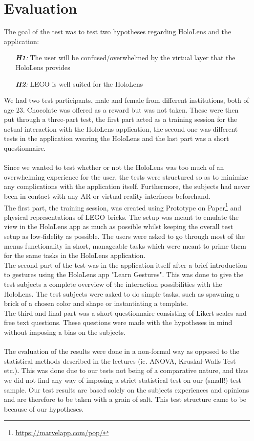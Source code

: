 
\section{Evaluation}
The goal of the test was to test two hypotheses regarding HoloLens and the application:
\begin{itemize}
	\item[\textit{\textbf{H1}:}] The user will be confused/overwhelmed by the virtual layer that the HoloLens provides
	\item[\textit{\textbf{H2}:}] LEGO is well suited for the HoloLens
\end{itemize}
We had two test participants, male and female from different institutions, both of age 23. Chocolate was offered as a reward but was not taken. These were then put through a three-part test, the first part acted as a training session for the actual interaction with the HoloLens application, the second one was different tests in the application wearing the HoloLens and the last part was a short questionnaire.\\
\\
Since we wanted to test whether or not the HoloLens was too much of an overwhelming experience for the user, the tests were structured so as to minimize any complications with the application itself. Furthermore, the subjects had never been in contact with any AR or virtual reality interfaces beforehand.\\
The first part, the training session, was created using Prototype on Paper\footnote{\url{https://marvelapp.com/pop/}} and physical representations of LEGO bricks. The setup was meant to emulate the view in the HoloLens app as much as possible whilst keeping the overall test setup as low-fidelity as possible. The users were asked to go through most of the menus functionality in short, manageable tasks which were meant to prime them for the same tasks in the HoloLens application.\\
The second part of the test was in the application itself after a brief introduction to gestures using the HoloLens app "Learn Gestures". This was done to give the test subjects a complete overview of the interaction possibilities with the HoloLens. The test subjects were asked to do simple tasks, such as spawning a brick of a chosen color and shape or instantiating a template.\\
The third and final part was a short questionnaire consisting of Likert scales and free text questions. These questions were made with the hypotheses in mind without imposing a bias on the subjects.\\
\\
The evaluation of the results were done in a non-formal way as opposed to the statistical methods described in the lectures (ie. ANOVA, Kruskal-Walls Test etc.). This was done due to our tests not being of a comparative nature, and thus we did not find any way of imposing a strict statistical test on our (small!) test sample. Our test results are based solely on the subjects experiences and opinions and are therefore to be taken with a grain of salt. This test structure came to be because of our hypotheses.

